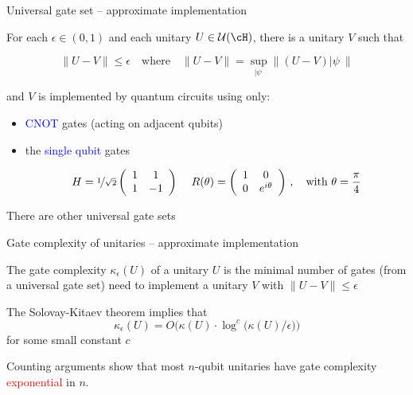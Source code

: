 \begin{frame}{Universal gate set -- approximate implementation}

For each $\epsilon\in (0,1)$ and each unitary $U\in {\cal U}(\cH)$, there is a unitary $V$ such that

\[
\| U - V \| \le \epsilon \quad\mbox{where}\quad \|U-V\| = \sup_{|\psi\>} \|(U-V)|\psi\>\|
\]

and $V$ is implemented by quantum circuits using only:

\medskip
\begin{itemize}
\item \textcolor{blue}{CNOT} gates (acting on adjacent qubits)

\bigskip
\item the \textcolor{blue}{single qubit} gates

\[
H = \nicefrac{1}{\sqrt{2}}
\left( 
\begin{array}{cc}
1 & 1 \\
1 & -1
\end{array}
\right)\,\quad
R(\theta) = 
\left( 
\begin{array}{cc}
1 & 0 \\
0 & e^{i\theta}
\end{array}
\right)\,,
\quad\mbox{with } \theta=\frac{\pi}{4}
\]
\end{itemize}

\pause

\bigskip
There are other universal gate sets

\end{frame}




\begin{frame}{Gate complexity of unitaries -- approximate implementation}

The gate complexity $\kappa_\epsilon(U)$ of a unitary $U$ is the minimal number of gates (from a universal gate set) need to implement a unitary $V$ with $\|U-V\|\le\epsilon$

\pause

\bigskip

\bigskip
The Solovay-Kitaev theorem implies that 
\[
\kappa_\epsilon(U) = O\Big(\kappa(U) \cdot \log^c\big(\kappa(U)/\epsilon\big)\Big)
\]
for some small constant $c$

\pause

\bigskip

\bigskip
Counting arguments show that most $n$-qubit unitaries have gate complexity \textcolor{red}{exponential} in $n$.

\end{frame}

